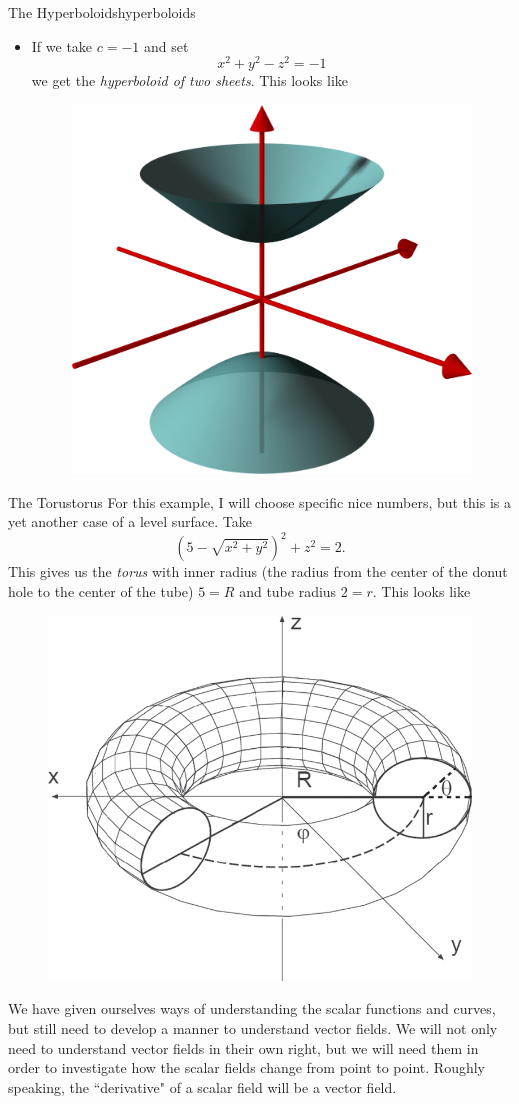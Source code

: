 \begin{ex}{The Hyperboloids}{hyperboloids}
\begin{itemize}
                    \item If we take $c=-1$ and set
                    \[
                    x^2+y^2-z^2=-1
                    \]
                    we get the \emph{hyperboloid of two sheets}.  This looks like
                    \begin{figure}[H]
                        \centering
                        \includegraphics[width=.4\textwidth]{Figures_Part_6/hyperboloid_2_sheet.png}
                    \end{figure}
                \end{itemize}
                \end{ex}
                
                \begin{ex}{The Torus}{torus}
                For this example, I will choose specific nice numbers, but this is a yet another case of a level surface.  Take
                \[
                \left(5-\sqrt{x^2+y^2}\right)^2+z^2=2.
                \]
                This gives us the \emph{torus} with inner radius (the radius from the center of the donut hole to the center of the tube) $5=R$ and tube radius $2=r$. This looks like
                \begin{figure}[H]
                    \centering
                    \includegraphics[width=.4\textwidth]{Figures_Part_6/torus.png}
                \end{figure}
                \end{ex}
                
                
                We have given ourselves ways of understanding the scalar functions and curves, but still need to develop a manner to understand vector fields.  We will not only need to understand vector fields in their own right, but we will need them in order to investigate how the scalar fields change from point to point.  Roughly speaking, the ``derivative" of a scalar field will be a vector field.
                
